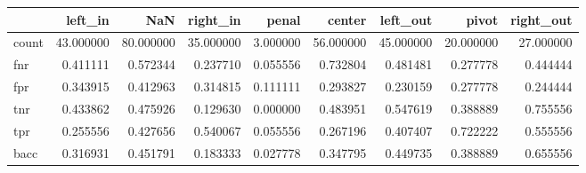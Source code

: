 \begin{tabular}{lrrrrrrrr}
\toprule
{} &    left\_in &        NaN &   right\_in &     penal &     center &   left\_out &      pivot &  right\_out \\
\midrule
count &  43.000000 &  80.000000 &  35.000000 &  3.000000 &  56.000000 &  45.000000 &  20.000000 &  27.000000 \\
fnr   &   0.411111 &   0.572344 &   0.237710 &  0.055556 &   0.732804 &   0.481481 &   0.277778 &   0.444444 \\
fpr   &   0.343915 &   0.412963 &   0.314815 &  0.111111 &   0.293827 &   0.230159 &   0.277778 &   0.244444 \\
tnr   &   0.433862 &   0.475926 &   0.129630 &  0.000000 &   0.483951 &   0.547619 &   0.388889 &   0.755556 \\
tpr   &   0.255556 &   0.427656 &   0.540067 &  0.055556 &   0.267196 &   0.407407 &   0.722222 &   0.555556 \\
bacc  &   0.316931 &   0.451791 &   0.183333 &  0.027778 &   0.347795 &   0.449735 &   0.388889 &   0.655556 \\
\bottomrule
\end{tabular}
